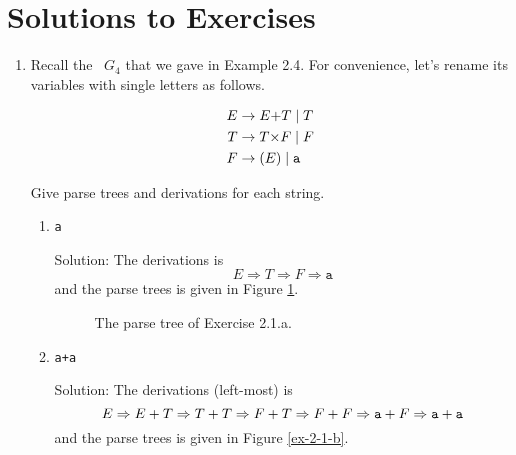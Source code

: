 \section*{Solutions to Exercises}

\begin{enumerate}[font=\bfseries,label=2.\arabic*]


\item Recall the \cfg ~$G_4$ that we gave in Example 2.4. For convenience, let’s rename its variables with single letters as follows.

\begin{align*}
    E &\rightarrow E {\tt +} T \mid T \\
    T &\rightarrow T \texttt{$\times$} F \mid F \\
    F &\rightarrow (E) \mid {\tt a} \\
\end{align*}

Give parse trees and derivations for each string.

\begin{enumerate}[font=\bfseries,label=\alph*.]

    \item {\tt a}
    
    Solution: The derivations is $$E\Rightarrow T\Rightarrow F\Rightarrow \texttt{a}$$ and the parse trees is given in Figure \ref{ex-2-1-a}.
    
    \begin{figure}
    \centering
    \caption{The parse tree of Exercise 2.1.a.}
    \label{ex-2-1-a}
    \end{figure}
    
    \item {\tt a+a}
    
    Solution: The derivations (left-most) is $$E\Rightarrow E+T\Rightarrow T+T\Rightarrow F+T\Rightarrow F+F\Rightarrow {\tt a}+F\Rightarrow {\tt a}+{\tt a}$$ and the parse trees is given in Figure \ref{ex-2-1-b}.
    

\end{enumerate}
\end{enumerate}
